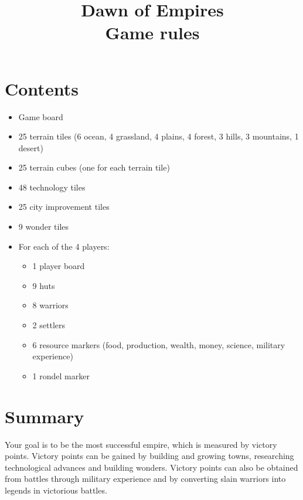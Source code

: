 \documentclass[11pt,a4paper,titlepage]{article}
\title{\Huge \blueb Dawn of Empires \\ \vspace{10mm}
  \blue Game rules}
\date{}
\begin{document}
\maketitle

\section{Contents}{
  \begin{itemize}
  \item Game board
  \item 25 terrain tiles (6 ocean, 4 grassland, 4 plains, 4 forest, 3 hills, 3 mountains, 1 desert)
  \item 25 terrain cubes (one for each terrain tile)
  \item 48 technology tiles
  \item 25 city improvement tiles
  \item 9 wonder tiles
  \item For each of the 4 players:
    \begin{itemize}
    \item 1 player board
    \item 9 huts
    \item 8 warriors
    \item 2 settlers
    \item 6 resource markers (food, production, wealth, money, science, military experience)
    \item 1 rondel marker
    \end{itemize}
  \end{itemize}
}\label{sec:contents}

\section{Summary}{
  Your goal is to be the most successful empire, which is measured by
  victory points. Victory points can be gained by building and growing towns,
  researching technological advances and building wonders. Victory points
  can also be obtained from battles through military experience and by
  converting slain warriors into legends in victorious battles.
}\label{sec:summary}
\end{document}
